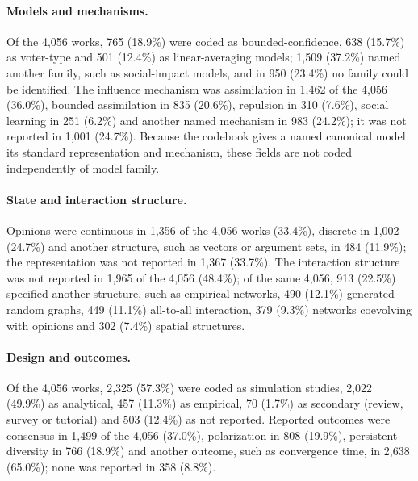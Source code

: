 \paragraph{Models and mechanisms.}
Of the 4,056 works, 765 (18.9\%) were coded as bounded-confidence, 638 (15.7\%) as voter-type and 501 (12.4\%) as linear-averaging models; 1,509 (37.2\%) named another family, such as social-impact models, and in 950 (23.4\%) no family could be identified. %
The influence mechanism was assimilation in 1,462 of the 4,056 (36.0\%), bounded assimilation in 835 (20.6\%), repulsion in 310 (7.6\%), social learning in 251 (6.2\%) and another named mechanism in 983 (24.2\%); it was not reported in 1,001 (24.7\%). %
Because the codebook gives a named canonical model its standard representation and mechanism, these fields are not coded independently of model family. %

\paragraph{State and interaction structure.}
Opinions were continuous in 1,356 of the 4,056 works (33.4\%), discrete in 1,002 (24.7\%) and another structure, such as vectors or argument sets, in 484 (11.9\%); the representation was not reported in 1,367 (33.7\%). %
The interaction structure was not reported in 1,965 of the 4,056 (48.4\%); of the same 4,056, 913 (22.5\%) specified another structure, such as empirical networks, 490 (12.1\%) generated random graphs, 449 (11.1\%) all-to-all interaction, 379 (9.3\%) networks coevolving with opinions and 302 (7.4\%) spatial structures. %

\paragraph{Design and outcomes.}
Of the 4,056 works, 2,325 (57.3\%) were coded as simulation studies, 2,022 (49.9\%) as analytical, 457 (11.3\%) as empirical, 70 (1.7\%) as secondary (review, survey or tutorial) and 503 (12.4\%) as not reported. %
Reported outcomes were consensus in 1,499 of the 4,056 (37.0\%), polarization in 808 (19.9\%), persistent diversity in 766 (18.9\%) and another outcome, such as convergence time, in 2,638 (65.0\%); none was reported in 358 (8.8\%). %

